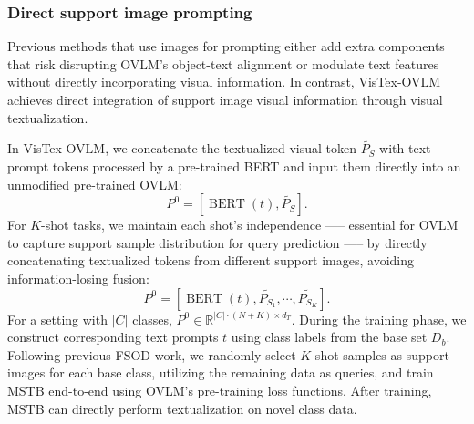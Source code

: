 \documentclass[10pt,twocolumn,letterpaper]{article}
\begin{document}
\subsubsection{Direct support image prompting}
Previous methods that use images for prompting either add extra components \cite{luddecke2022clipseg, xu2023mqdet} that risk disrupting OVLM's object-text alignment or modulate text features \cite{xu2023mqdet} without directly incorporating visual information. In contrast, VisTex-OVLM achieves direct integration of support image visual information through visual textualization.

In VisTex-OVLM, we concatenate the textualized visual token $\widetilde{P_S}$ with text prompt tokens processed by a pre-trained BERT and input them directly into an unmodified pre-trained OVLM:
\begin{equation}
    P^0 = \left[ \operatorname{BERT}\left(t\right), \widetilde{P_S} \right].
    \label{eq5}
\end{equation}
For $K$-shot tasks, we maintain each shot’s independence —-- essential for OVLM to capture support sample distribution for query prediction —-- by directly concatenating textualized tokens from different support images, avoiding information-losing fusion:
\begin{equation}
    P^0 = \left[ \operatorname{BERT}\left(t\right), \widetilde{P_{S_1}}, \cdots, \widetilde{P_{S_K}} \right].
    \label{eq6}
\end{equation}
For a setting with $\lvert C\rvert$ classes, $P^0\in \mathbb{R}^{\lvert C\rvert \cdot \left(N+K\right)\times d_{T}}$. During the training phase, we construct corresponding text prompts $t$ using class labels from the base set $D_b$. Following previous FSOD work, we randomly select $K$-shot samples as support images for each base class, utilizing the remaining data as queries, and train MSTB end-to-end using OVLM's pre-training loss functions. After training, MSTB can directly perform textualization on novel class data.
\end{document}
